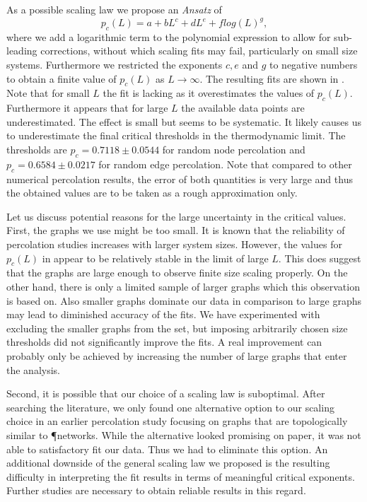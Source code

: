 		As a possible scaling law we propose an \textit{Ansatz} of
		\begin{equation}
			p_c(L) = a + b L^{c} + d L^{e} + f log(L)^{g},
		\end{equation}
		where we add a logarithmic term to the polynomial expression to allow for sub-leading corrections, without which scaling fits may fail, particularly on small size systems. Furthermore we restricted the exponents $c,e$ and $g$ to negative numbers to obtain a finite value of $p_c(L)$ as $L \to \infty$. The resulting fits are shown in . Note that for small $L$ the fit is lacking as it overestimates the values of $p_c(L)$.  Furthermore it appears that for large $L$ the available data points are underestimated. The effect is small but seems to be systematic. It likely causes us to underestimate the final critical thresholds in the thermodynamic limit. The thresholds are $p_c = 0.7118 \pm 0.0544$ for random node percolation and $p_c = 0.6584 \pm 0.0217$ for random edge percolation. Note that compared to other numerical percolation results, the error of both quantities is very large and thus the obtained values are to be taken as a rough approximation only.

		Let us discuss potential reasons for the large uncertainty in the critical values. First, the graphs we use might be too small. It is known that the reliability of percolation studies increases with larger system sizes. However, the values for $p_c(L)$ in  appear to be relatively stable in the limit of large $L$. This does suggest that the graphs are large enough to observe finite size scaling properly. On the other hand, there is only a limited sample of larger graphs which this observation is based on. Also smaller graphs dominate our data in comparison to large graphs may lead to diminished accuracy of the fits. We have experimented with excluding the smaller graphs from the set, but imposing arbitrarily chosen size thresholds did not significantly improve the fits. A real improvement can probably only be achieved by increasing the number of large graphs that enter the analysis.

		Second, it is possible that our choice of a scaling law is suboptimal. After searching the literature, we only found one alternative option to our scaling choice in an earlier percolation study focusing on graphs that are topologically similar to \P networks. While the alternative looked promising on paper, it was not able to satisfactory fit our data. Thus we had to eliminate this option. An additional downside of the general scaling law we proposed is the resulting difficulty in interpreting the fit results in terms of meaningful critical exponents. Further studies are necessary to obtain reliable results in this regard.

